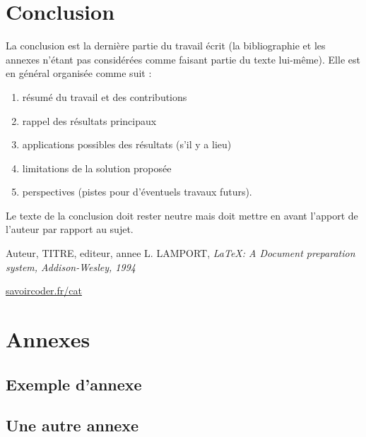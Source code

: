 \documentclass[a4paper, 12pt, twoside]{report}
\begin{document}
\chapter{Conclusion}
La conclusion est la dernière partie du travail écrit (la bibliographie et les annexes n’étant pas considérées comme faisant partie du texte lui-même). Elle est en général organisée comme suit :
            \begin{center}
            \begin{enumerate}
                \item résumé du travail et des contributions
                \item rappel des résultats principaux
                \item applications possibles des résultats (s’il y a lieu)
                \item limitations de la solution proposée
                \item perspectives (pistes pour d’éventuels travaux futurs).
            \end{enumerate}
   \end{center}
Le texte de la conclusion doit rester neutre mais doit mettre en avant l’apport de l’auteur par rapport au sujet.


\renewcommand{\bibname}{Bibliographie}
\renewcommand{\refname}{}
\begin{thebibliography}{2}
    Auteur, TITRE, editeur, annee
    L. LAMPORT, {\it \LaTeX : A Document preparation system, Addison-Wesley, 1994}
\end{thebibliography}

\renewcommand{\bibname}{Webographie}
\begin{thebibliography}{2}
    \url{savoircoder.fr/cat}
\end{thebibliography}

\chapter{Annexes}
\appendix
\makeatletter
\def\@seccntformat#1{Annexe~\csname the#1\endcsname:\quad}
\makeatother
	\section{Exemple d'annexe}
	\section{Une autre annexe}
\end{document}
